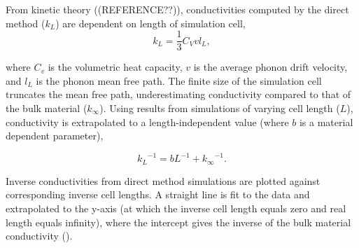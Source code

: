 \documentclass[%
preprint,                                  %
nofootinbib,
 amsmath,amssymb,
 aps,
]{revtex4-1}
\begin{document}


From kinetic theory ((REFERENCE??)), conductivities computed by the direct method ($k_L$) are dependent on length of simulation cell,
\begin{equation}
k_{L} = \frac{1}{3} C_{V} v l_{L} \label{length-dep},
\end{equation}

where $C_v$ is the volumetric heat capacity, $v$ is the average phonon drift velocity, and $l_L$ is the phonon mean free path. The finite size of the simulation cell truncates the mean free path, underestimating conductivity compared to that of the bulk material ($k_\infty$). Using results from simulations of varying cell length ($L$), conductivity is extrapolated to a length-independent value (where $b$ is a material dependent parameter),

\begin{equation}
{k_{L}}^{-1} = b L^{-1} + {k_{\infty}}^{-1} \label{linear-extrap}.
\end{equation}

Inverse conductivities from direct method simulations are plotted against corresponding inverse cell lengths. A straight line is fit to the data and extrapolated to the y-axis (at which the inverse cell length equals zero and real length equals infinity), where the intercept gives the inverse of the bulk material conductivity (\citet{Schelling2002}).

\end{document}
